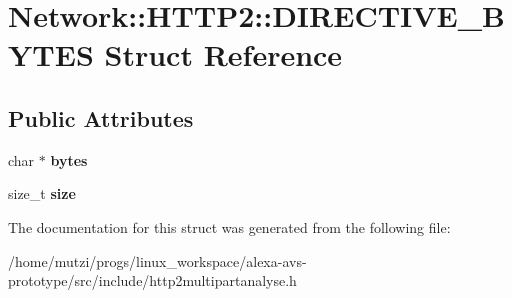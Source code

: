 \hypertarget{structNetwork_1_1HTTP2_1_1DIRECTIVE__BYTES}{}\section{Network\+:\+:H\+T\+T\+P2\+:\+:D\+I\+R\+E\+C\+T\+I\+V\+E\+\_\+\+B\+Y\+T\+ES Struct Reference}
\label{structNetwork_1_1HTTP2_1_1DIRECTIVE__BYTES}
\subsection*{Public Attributes}
\begin{DoxyCompactItemize}
\item 
\mbox{\label{structNetwork_1_1HTTP2_1_1DIRECTIVE__BYTES_a28f7d91f0d3da806b49e2a501423cc92}} 
char $\ast$ {\bfseries bytes}
\item 
\mbox{\label{structNetwork_1_1HTTP2_1_1DIRECTIVE__BYTES_a0074bf6ebab3ed9493ac7806c9dd2b8d}} 
size\+\_\+t {\bfseries size}
\end{DoxyCompactItemize}


The documentation for this struct was generated from the following file\+:\begin{DoxyCompactItemize}
\item 
/home/mutzi/progs/linux\+\_\+workspace/alexa-\/avs-\/prototype/src/include/http2multipartanalyse.\+h\end{DoxyCompactItemize}

